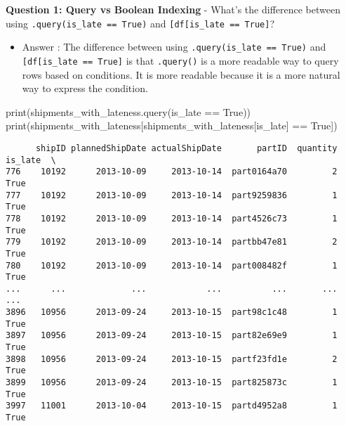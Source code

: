 \documentclass[
  letterpaper,
  DIV=11,
  numbers=noendperiod]{scrartcl}
\newenvironment{Shaded}{\begin{snugshade}}{\end{snugshade}}
\newcommand{\BuiltInTok}[1]{\textcolor[rgb]{0.00,0.23,0.31}{#1}}
\newcommand{\NormalTok}[1]{\textcolor[rgb]{0.00,0.23,0.31}{#1}}
\newcommand{\OperatorTok}[1]{\textcolor[rgb]{0.37,0.37,0.37}{#1}}
\newcommand{\StringTok}[1]{\textcolor[rgb]{0.13,0.47,0.30}{#1}}
\newcommand{\VariableTok}[1]{\textcolor[rgb]{0.07,0.07,0.07}{#1}}
\providecommand{\tightlist}{%
  \setlength{\itemsep}{0pt}\setlength{\parskip}{0pt}}
\begin{document}
\begin{tcolorbox}[enhanced jigsaw, colframe=quarto-callout-important-color-frame, title=\textcolor{quarto-callout-important-color}{\faExclamation}\hspace{0.5em}{🤔 Discussion Questions: Subset Mental Model}, breakable, opacityback=0, arc=.35mm, leftrule=.75mm, titlerule=0mm, left=2mm, toptitle=1mm, rightrule=.15mm, bottomtitle=1mm, bottomrule=.15mm, opacitybacktitle=0.6, toprule=.15mm, colback=white, coltitle=black, colbacktitle=quarto-callout-important-color!10!white]

\textbf{Question 1: Query vs Boolean Indexing} - What's the difference
between using
\texttt{.query(\textquotesingle{}is\_late\ ==\ True\textquotesingle{})}
and
\texttt{{[}df{[}\textquotesingle{}is\_late\textquotesingle{}{]}\ ==\ True{]}}?

\begin{itemize}
\tightlist
\item
  Answer : The difference between using
  \texttt{.query(\textquotesingle{}is\_late\ ==\ True\textquotesingle{})}
  and
  \texttt{{[}df{[}\textquotesingle{}is\_late\textquotesingle{}{]}\ ==\ True{]}}
  is that \texttt{.query()} is a more readable way to query rows based
  on conditions. It is more readable because it is a more natural way to
  express the condition.
\end{itemize}

\begin{Shaded}
\begin{Highlighting}[]
\BuiltInTok{print}\NormalTok{(shipments\_with\_lateness.query(}\StringTok{\textquotesingle{}is\_late == True\textquotesingle{}}\NormalTok{))}
\BuiltInTok{print}\NormalTok{(shipments\_with\_lateness[shipments\_with\_lateness[}\StringTok{\textquotesingle{}is\_late\textquotesingle{}}\NormalTok{] }\OperatorTok{==} \VariableTok{True}\NormalTok{])}
\end{Highlighting}
\end{Shaded}

\begin{verbatim}
      shipID plannedShipDate actualShipDate       partID  quantity  is_late  \
776    10192      2013-10-09     2013-10-14  part0164a70         2     True   
777    10192      2013-10-09     2013-10-14  part9259836         1     True   
778    10192      2013-10-09     2013-10-14  part4526c73         1     True   
779    10192      2013-10-09     2013-10-14  partbb47e81         2     True   
780    10192      2013-10-09     2013-10-14  part008482f         1     True   
...      ...             ...            ...          ...       ...      ...   
3896   10956      2013-09-24     2013-10-15  part98c1c48         1     True   
3897   10956      2013-09-24     2013-10-15  part82e69e9         1     True   
3898   10956      2013-09-24     2013-10-15  partf23fd1e         2     True   
3899   10956      2013-09-24     2013-10-15  part825873c         1     True   
3997   11001      2013-10-04     2013-10-15  partd4952a8         1     True   


\end{verbatim}
\end{tcolorbox}
\end{document}
